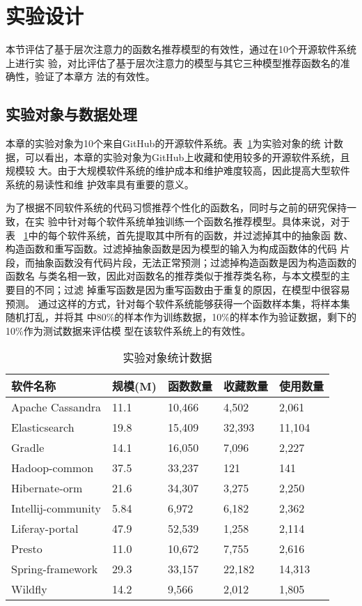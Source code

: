 \section{实验设计}
本节评估了基于层次注意力的函数名推荐模型的有效性，通过在10个开源软件系统上进行实
验，对比评估了基于层次注意力的模型与其它三种模型推荐函数名的准确性，验证了本章方
法的有效性。

\subsection{实验对象与数据处理}
本章的实验对象为10个来自GitHub的开源软件系统。表~\ref{benchmark3}为实验对象的统
计数据，可以看出，本章的实验对象为GitHub上收藏和使用较多的开源软件系统，且规模较
大。由于大规模软件系统的维护成本和维护难度较高，因此提高大型软件系统的易读性和维
护效率具有重要的意义。


为了根据不同软件系统的代码习惯推荐个性化的函数名，同时与之前的研究保持一致，在实
验中针对每个软件系统单独训练一个函数名推荐模型。具体来说，对于表
~\ref{benchmark3}中的每个软件系统，首先提取其中所有的函数，并过滤掉其中的抽象函
数、构造函数和重写函数。过滤掉抽象函数是因为模型的输入为构成函数体的代码
片段，而抽象函数没有代码片段，无法正常预测；过滤掉构造函数是因为构造函数的函数名
与类名相一致，因此对函数名的推荐类似于推荐类名称，与本文模型的主要目的不同；过滤
掉重写函数是因为重写函数由于重复的原因，在模型中很容易预测。
通过这样的方式，针对每个软件系统能够获得一个函数样本集，将样本集随机打乱，并将其
中80\%的样本作为训练数据，10\%的样本作为验证数据，剩下的10\%作为测试数据来评估模
型在该软件系统上的有效性。

\begin{table}[!t]
\zihaowu
\renewcommand{\arraystretch}{1.4}
\caption{实验对象统计数据}
\label{benchmark3}
\centering
\begin{tabular}{l@{\quad}l@{\quad}l@{\quad}l@{\quad}l}
\toprule 
软件名称 &规模(M) &函数数量 &收藏数量 &使用数量\\ 
\midrule
Apache Cassandra &11.1 &10,466 &4,502 &2,061\\ 
Elasticsearch &19.8 &15,409 &32,393 &11,104\\ 
Gradle &14.1 &16,050 &7,096 &2,227\\ 
Hadoop-common &37.5 &33,237 &121 &141\\ 
Hibernate-orm &21.6 &34,307 &3,275 &2,250\\ 
Intellij-community &5.84 &6,972 &6,182 &2,362\\ 
Liferay-portal &47.9 &52,539 &1,258 &2,114\\ 
Presto &11.0 &10,672 &7,755 &2,616\\ 
Spring-framework &29.3 &33,157 &22,182 &14,313\\ 
Wildfly &14.2 &9,566 &2,012 &1,805\\ 
\bottomrule
\end{tabular}
\end{table}

